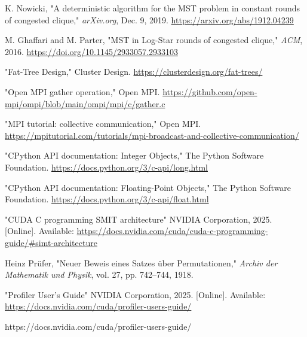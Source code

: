 \documentclass[english, 12pt, a4paper, elec, utf8, a-2b, online]{aaltothesis}
\begin{document}
\begin{thebibliography}{99}
	K. Nowicki, "A deterministic algorithm for the MST problem in constant rounds of congested clique," 
	\textit{arXiv.org}, Dec. 9, 2019. 
	\url{https://arxiv.org/abs/1912.04239}
	
	M. Ghaffari and M. Parter, "MST in Log-Star rounds of congested clique," 
	\textit{ACM}, 2016. 
	\url{https://doi.org/10.1145/2933057.2933103}
	
	"Fat-Tree Design," Cluster Design. 
	\url{https://clusterdesign.org/fat-trees/}
	
	"Open MPI gather operation," Open MPI. 
	\url{https://github.com/open-mpi/ompi/blob/main/ompi/mpi/c/gather.c}
	
	"MPI tutorial: collective communication," Open MPI. 
	\url{https://mpitutorial.com/tutorials/mpi-broadcast-and-collective-communication/}
	
	"CPython API documentation: Integer Objects," The Python Software Foundation. 
	\url{https://docs.python.org/3/c-api/long.html}
	
	"CPython API documentation: Floating-Point Objects," The Python Software Foundation. 
	\url{https://docs.python.org/3/c-api/float.html}

	 "CUDA C programming SMIT architecture" NVIDIA Corporation, 2025. [Online]. Available: \url{https://docs.nvidia.com/cuda/cuda-c-programming-guide/#simt-architecture}

	 Heinz Prüfer, "Neuer Beweis eines Satzes über Permutationen,"  \textit{Archiv der Mathematik und Physik}, vol. 27, pp. 742–744, 1918.

	 "Profiler User’s Guide" NVIDIA Corporation, 2025. [Online]. Available: \url{	https://docs.nvidia.com/cuda/profiler-users-guide/}


	https://docs.nvidia.com/cuda/profiler-users-guide/
\end{thebibliography}
\end{document}
